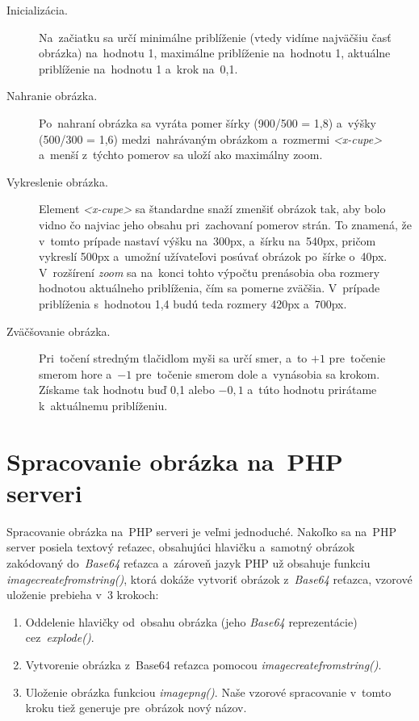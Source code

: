 \begin{description}
	\item[Inicializácia.] Na~začiatku sa určí minimálne priblíženie (vtedy vidíme najväčšiu časť obrázka) na~hodnotu 1, maximálne priblíženie na~hodnotu 1, aktuálne priblíženie na~hodnotu 1 a~krok na~0,1.

	\item[Nahranie obrázka.] Po~nahraní obrázka sa vyráta pomer šírky (900/500 = 1,8) a~výšky (500/300 = 1,6) medzi~nahrávaným obrázkom a~rozmermi \emph{<x-cupe>} a~menší z~týchto pomerov sa uloží ako maximálny zoom.

	\item[Vykreslenie obrázka.] Element \emph{<x-cupe>} sa štandardne snaží zmenšiť obrázok tak, aby bolo vidno čo najviac jeho obsahu pri~zachovaní pomerov strán. To znamená, že v~tomto prípade nastaví výšku na~300px, a~šírku na~540px, pričom vykreslí 500px a~umožní užívateľovi posúvať obrázok po~šírke o~40px. V~rozšírení \emph{zoom} sa na~konci tohto výpočtu prenásobia oba rozmery hodnotou aktuálneho priblíženia, čím sa pomerne zväčšia. V~prípade priblíženia s~hodnotou 1,4 budú teda rozmery 420px a~700px.

	\item[Zväčšovanie obrázka.] Pri~točení stredným tlačidlom myši sa určí smer, a~to $+1$ pre~točenie smerom hore a~$\minus1$ pre~točenie smerom dole a~vynásobia sa krokom. Získame tak hodnotu buď 0,1 alebo $\minus0,1$ a~túto hodnotu prirátame k~aktuálnemu priblíženiu.
\end{description}


\section{Spracovanie obrázka na~PHP serveri}

Spracovanie obrázka na~PHP serveri je veľmi jednoduché. Nakoľko sa na~PHP server posiela textový reťazec, obsahujúci hlavičku a~samotný obrázok zakódovaný do~\emph{Base64} reťazca a~zároveň jazyk PHP už obsahuje funkciu \emph{imagecreatefromstring()}, ktorá dokáže vytvoriť obrázok z~\emph{Base64} reťazca, vzorové uloženie prebieha v~3 krokoch:

\begin{enumerate}
	\item Oddelenie hlavičky od~obsahu obrázka (jeho \emph{Base64} reprezentácie) cez~\emph{explode()}.
	\item Vytvorenie obrázka z~Base64 reťazca pomocou \emph{imagecreatefromstring()}.
	\item Uloženie obrázka funkciou \emph{imagepng()}. Naše vzorové spracovanie v~tomto kroku tiež generuje pre~obrázok nový názov.
\end{enumerate}

